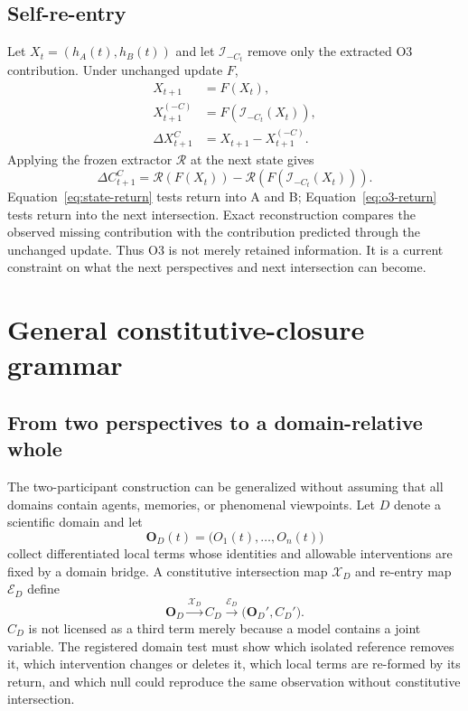 \documentclass[11pt,a4paper]{article}
\begin{document}
\subsection{Self-re-entry}

Let $X_t=(h_A(t),h_B(t))$ and let $\mathcal I_{-C_t}$ remove only the extracted O3 contribution. Under unchanged update $F$,
\begin{align}
 X_{t+1}&=F(X_t),\\
 X_{t+1}^{(-C)}&=F(\mathcal I_{-C_t}(X_t)),\\
 \Delta X_{t+1}^{C}&=X_{t+1}-X_{t+1}^{(-C)}.
 \label{eq:state-return}
\end{align}
Applying the frozen extractor $\mathcal R$ at the next state gives
\begin{equation}
 \Delta C_{t+1}^{C}
 =\mathcal R(F(X_t))-\mathcal R(F(\mathcal I_{-C_t}(X_t))).
 \label{eq:o3-return}
\end{equation}
Equation~\eqref{eq:state-return} tests return into A and B; Equation~\eqref{eq:o3-return} tests return into the next intersection. Exact reconstruction compares the observed missing contribution with the contribution predicted through the unchanged update. Thus O3 is not merely retained information. It is a current constraint on what the next perspectives and next intersection can become.

\section{General constitutive-closure grammar}

\subsection{From two perspectives to a domain-relative whole}

The two-participant construction can be generalized without assuming that all domains contain agents, memories, or phenomenal viewpoints. Let $D$ denote a scientific domain and let
\begin{equation}
 \mathbf O_D(t)=\bigl(O_1(t),\ldots,O_n(t)\bigr)
\end{equation}
collect differentiated local terms whose identities and allowable interventions are fixed by a domain bridge. A constitutive intersection map $\mathcal X_D$ and re-entry map $\mathcal E_D$ define
\begin{equation}
 \mathbf O_D
 \xrightarrow{\mathcal X_D}
 C_D
 \xrightarrow{\mathcal E_D}
 \bigl(\mathbf O_D',C_D'\bigr).
 \label{eq:domain-grammar}
\end{equation}
$C_D$ is not licensed as a third term merely because a model contains a joint variable. The registered domain test must show which isolated reference removes it, which intervention changes or deletes it, which local terms are re-formed by its return, and which null could reproduce the same observation without constitutive intersection.
\end{document}
